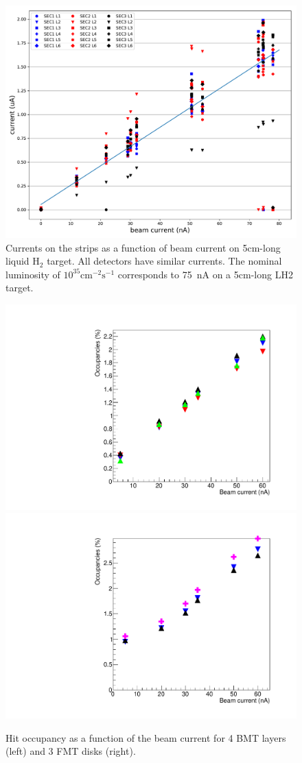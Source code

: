 \begin{figure}[htb]
 \includegraphics[width=1.0\columnwidth,keepaspectratio]{images/BMT_IvsLumi}
 \caption{Currents on the strips as a function of beam current on 5cm-long liquid H$_2$ target. All detectors have similar currents. The nominal luminosity of $10^{35}\text{cm}^{-2}\text{s}^{-1}$ corresponds to 75~nA on a 5cm-long LH2 target.}
 \label{fig:mm-fig14}
\end{figure}

\begin{figure}[htb]
 \includegraphics[width=.49\columnwidth,keepaspectratio]{images/OccupanciesVSbeamCurrent_BMT_only4Layers.pdf}
 \includegraphics[width=.49\columnwidth,keepaspectratio]{images/OccupanciesVSbeamCurrent_FMT_only3Layers.pdf}
 \caption{Hit occupancy as a function of the beam current for 4 BMT layers (left) and 3 FMT disks (right).}
 \label{fig:mm-fig16}
\end{figure}

